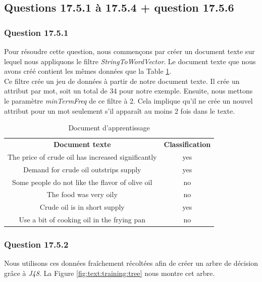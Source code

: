 \documentclass[11pt,a4paper]{article}
\begin{document}
		\subsection{Questions 17.5.1 à 17.5.4 + question 17.5.6}
		
			\subsubsection*{Question 17.5.1}
			
			Pour résoudre cette question, nous commençons par créer un document texte sur lequel nous appliquons le filtre \textit{StringToWordVector}. Le document texte que nous avons créé contient les mêmes données que la Table \ref{tab:oil:training}.\\
			
			Ce filtre crée un jeu de données à partir de notre document texte. Il crée un attribut par mot, soit un total de 34 pour notre exemple. Ensuite, nous mettons le paramètre \textit{minTermFreq} de ce filtre à 2. Cela implique qu'il ne crée un nouvel attribut pour un mot seulement s'il apparaît au moins 2 fois dans le texte.
				
			\begin{table}[h]
				\centering
				\caption{Document d'apprentissage}
				\label{tab:oil:training}
				\begin{tabular}{|c c|}
					\hline
					\textbf{Document texte} & \textbf{Classification}\\
					The price of crude oil has increased significantly & yes\\
					Demand for crude oil outstrips supply & yes\\
					Some people do not like the flavor of olive oil & no\\
					The food was very oily & no\\
					Crude oil is in short supply & yes\\
					Use a bit of cooking oil in the frying pan & no\\
					\hline
				\end{tabular}
			\end{table}
				
			\subsubsection*{Question 17.5.2}
			
			Nous utilisons ces données fraîchement récoltées afin de créer un arbre de décision grâce à \textit{J48}. La Figure \ref{fig:text:training:tree} nous montre cet arbre.
			
\end{document}
